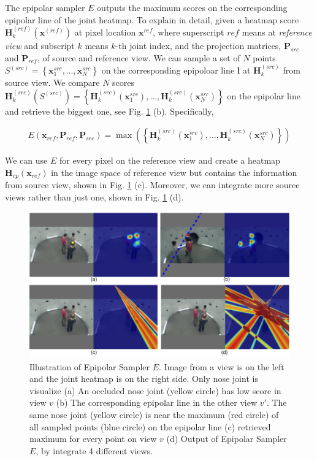 The epipolar sampler $\mathit{E}$ outputs the maximum scores on the corresponding epipolar line of the joint heatmap. To explain in detail, given a heatmap score $\mathbf{H}_k^{(ref)}(\mathbf{x}^{(ref)})$ at pixel location $\mathbf{x}^{ref}$, where superscript $ref$ means at \textit{reference view} and subscript $k$ means $k$-th joint index, and the projection matrices, $\mathbf{P}_{src}$ and $\mathbf{P}_{ref}$, of source and reference view. We can sample a set of $N$ points $S^{(src)} = \left\{\mathbf{x}_{1}^{src}, \dots, \mathbf{x}_{N}^{src}  \right\}$ on the corresponding epipoloar line $\mathbf{l}$ at $\mathbf{H}_k^{(src)}$ from source view. We compare $N$ scores $\mathbf{H}_k^{(src)}(S^{(src)}) = \left\{\mathbf{H}_k^{(src)}(\mathbf{x}_{1}^{src}), \dots, \mathbf{H}_k^{(src)}(\mathbf{x}_{N}^{src}) \right\}$ on the epipolar line and retrieve the biggest one, see Fig. \ref{fig:epipolar-sampler} (b). Specifically,

\begin{gather}
	\mathit{E}(\mathbf{x}_{ref},\mathbf{P}_{ref}, \mathbf{P}_{src}) = 
	\max\left(
		\left\{\mathbf{H}_k^{(src)}(\mathbf{x}_{1}^{src}), \dots, \mathbf{H}_k^{(src)}(\mathbf{x}_{N}^{src}) \right\}
	\right)
\end{gather}

We can use $\mathit{E}$ for every pixel on the reference view and create a heatmap $\mathbf{H}_{ep}(\mathbf{x}_{ref})$ in the image space of reference view but contains the information from source view, shown in Fig. \ref{fig:epipolar-sampler} (c). Moreover, we can integrate more source views rather than just one, shown in Fig. \ref{fig:epipolar-sampler} (d).

\begin{figure}
	\centering
	\includegraphics[width=1.0\columnwidth]{figures/ch4/epipolar-sampler.png}
	\caption{Illustration of Epipolar Sampler $\mathit{E}$. Image from a view is on the left and the joint heatmap is on the right side. Only nose joint is visualize (a) An occluded nose joint (yellow circle) has low score in view $\mathit{v}$ (b) The corresponding epipolar line in the other view $\mathit{v}'$. The same nose joint (yellow circle) is near the maximum (red circle) of all sampled points (blue circle) on the epipolar line (c) retrieved maximum for every point on view $\mathit{v}$ (d) Output of Epipolar Sampler $\mathit{E}$, by integrate 4 different views.} 
	\label{fig:epipolar-sampler}
\end{figure}
